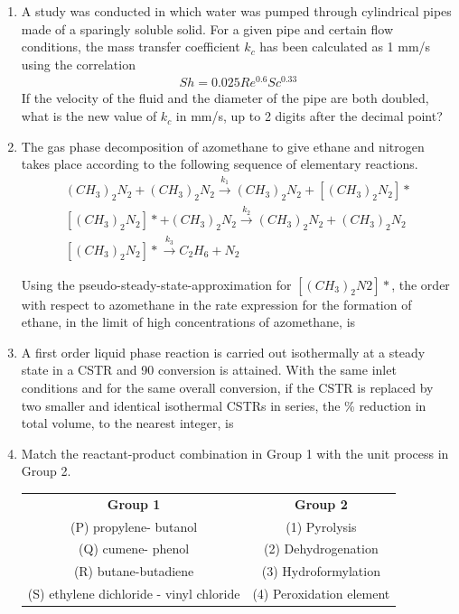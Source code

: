 \documentclass[journal,12pt,onecolumn]{IEEEtran}
\theoremstyle{remark}
\begin{document}
\begin{enumerate}
 \item A study was conducted in which water was pumped through cylindrical pipes made of a sparingly
 soluble solid. For a given pipe and certain flow conditions, the mass transfer coefficient $k_c$ has been
 calculated as 1 mm/s using the correlation \\ 
  \begin{align*}
 	Sh = 0.025 Re^{0.6} Sc^{0.33}
 \end{align*}
 If the velocity of the fluid and the diameter of the pipe are both doubled, what is the new value of $k_c$
 in mm/s, up to 2 digits after the decimal point?  \underline{\hspace{2cm}}
 
 
 \item The gas phase decomposition of azomethane to give ethane and nitrogen takes place according to
 the following sequence of elementary reactions.
 \begin{align*}
 (CH_3)_2N_2 + (CH_3)_2N_2 \overset{k_1}\rightarrow (CH_3)_2N_2 + [(CH_3)_2N_2]* \\
 [(CH_3)_2N_2]* + (CH_3)_2N_2 \overset{k_2}\rightarrow (CH_3)_2N_2 + (CH_3)_2N_2  \\
 [(CH_3)_2N_2]*  \overset{k_3}\rightarrow C_2H_6 +N_2
 \end{align*}
 
 Using the pseudo-steady-state-approximation for $[(CH_3)_2N2]*$, the order with respect to azomethane
 in the rate expression for the formation of ethane, in the limit of high concentrations of azomethane,
 is \underline{\hspace{2cm}}
 
 \item A first order liquid phase reaction is carried out isothermally at a steady state in a CSTR and 90%
 conversion is attained. With the same inlet conditions and for the same overall conversion, if the
 CSTR is replaced by two smaller and identical isothermal CSTRs in series, the \% reduction in total
 volume, to the nearest integer, is  \underline{\hspace{2cm}}
 
 \item Match the reactant-product combination in Group 1 with the unit process in Group 2. \\
  \begin{tabular}{c c}
 	\textbf{Group 1} & \textbf{Group 2} \\
 	(P) propylene- butanol & (1) Pyrolysis \\
 	(Q) cumene- phenol & (2) Dehydrogenation\\
 	(R) butane-butadiene & (3) Hydroformylation\\
 	(S) ethylene dichloride - vinyl chloride & (4) Peroxidation element 
 	

\end{tabular}
\end{enumerate}
\end{document}
